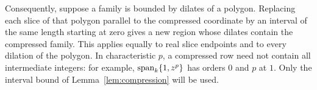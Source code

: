 Consequently, suppose a family is bounded by dilates of a polygon.
Replacing each slice of that polygon parallel to the compressed coordinate
by an interval of the same length starting at zero gives a new region
whose dilates contain the compressed family.  This applies equally to real
slice endpoints and to every dilation of the polygon.  In characteristic
$p$, a compressed row need not contain all intermediate integers: for
example, $\operatorname{span}_k\{1,z^p\}$ has orders $0$ and $p$ at $1$.  Only the
interval bound of Lemma~\ref{lem:compression} will be used.
